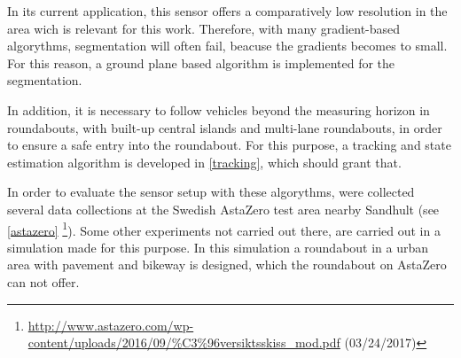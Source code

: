 \documentclass[11pt,oneside,openright]{mpreport}
\begin{document}

In its current application, this sensor offers a comparatively low resolution in the area wich is relevant for this work.
Therefore, with many gradient-based algorythms, segmentation will often fail, beacuse the gradients becomes to small.
For this reason, a ground plane based algorithm is implemented for the segmentation.


In addition, it is necessary to follow vehicles beyond the measuring horizon in roundabouts, with built-up central islands and multi-lane roundabouts, 
in order to ensure a safe entry into the roundabout.
For this purpose, a tracking and state estimation algorithm is developed in \cref{tracking}, which should grant that.


In order to evaluate the sensor setup with these algorythms, were collected several data collections at the Swedish AstaZero test area nearby Sandhult (see \cref{astazero}
\footnote{\url{http://www.astazero.com/wp-content/uploads/2016/09/\%C3\%96versiktsskiss_mod.pdf} (03/24/2017)}).
Some other experiments not carried out there, are carried out in a simulation made for this purpose. In this simulation a roundabout in a urban area 
with pavement and bikeway is designed, which the roundabout on AstaZero can not offer.
\end{document}
